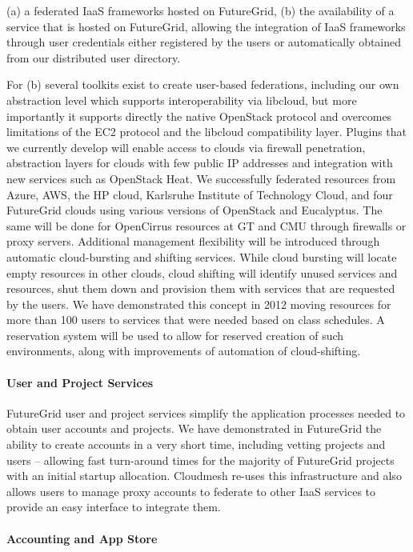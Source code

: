 \documentclass{tex/sig-alternate}
\begin{document}
(a) a federated IaaS frameworks hosted on FutureGrid,
(b) the availability of a service that is hosted on FutureGrid, allowing the integration of IaaS frameworks through user credentials either registered by the users or automatically obtained from our distributed user directory.


For (b) several toolkits exist to create user-based federations, including our own abstraction level which supports interoperability via libcloud, but more importantly it supports directly the native OpenStack protocol and overcomes limitations of the EC2 protocol and the libcloud compatibility layer. Plugins that we currently develop will enable access to clouds via firewall penetration, abstraction layers for clouds with few public IP addresses and integration with new services such as OpenStack Heat. We successfully federated resources from Azure, AWS, the HP cloud, Karlsruhe Institute of Technology Cloud, and four FutureGrid clouds using various versions of OpenStack and Eucalyptus. The same will be done for OpenCirrus resources at GT and CMU through firewalls or proxy servers.
Additional management flexibility will be introduced through automatic cloud-bursting and shifting services. While cloud bursting will locate empty resources in other clouds, cloud shifting will identify unused services and resources, shut them down and provision them with services that are requested by the users. We have demonstrated this concept in 2012 moving resources for more than 100 users to services that were needed based on class schedules. A reservation system will be used to allow for reserved creation of such environments, along with improvements of automation of cloud-shifting.


\paragraph{User and Project Services}


FutureGrid user and project services simplify the application processes needed to obtain user accounts and projects. We have demonstrated in FutureGrid the ability to create accounts in a very short time, including vetting projects and users – allowing fast turn-around times for the majority of FutureGrid projects with an initial startup allocation. Cloudmesh re-uses this infrastructure and also allows users to manage proxy accounts to federate to other IaaS services to provide an easy interface to integrate them.


\paragraph{Accounting and App Store}
\end{document}

